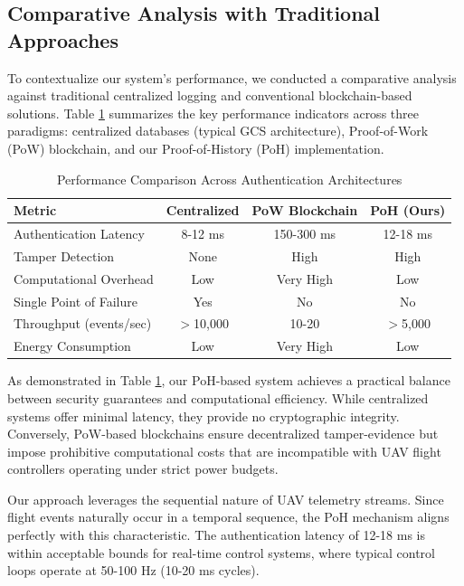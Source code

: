 \documentclass[preprint,12pt]{elsarticle}
\begin{document}

\subsection{Comparative Analysis with Traditional Approaches}

To contextualize our system's performance, we conducted a comparative analysis against traditional centralized logging and conventional blockchain-based solutions. Table \ref{tab:comparison} summarizes the key performance indicators across three paradigms: centralized databases (typical GCS architecture), Proof-of-Work (PoW) blockchain, and our Proof-of-History (PoH) implementation.

\begin{table}[h]
\centering
\small
\caption{Performance Comparison Across Authentication Architectures}
\label{tab:comparison}
\begin{tabular}{|p{3.2cm}|c|c|c|}
\hline
\textbf{Metric} & \textbf{Centralized} & \textbf{PoW Blockchain} & \textbf{PoH (Ours)} \\
\hline
Authentication Latency & 8-12 ms & 150-300 ms & 12-18 ms \\
\hline
Tamper Detection & None & High & High \\
\hline
Computational Overhead & Low & Very High & Low \\
\hline
Single Point of Failure & Yes & No & No \\
\hline
Throughput (events/sec) & $>$10,000 & 10-20 & $>$5,000 \\
\hline
Energy Consumption & Low & Very High & Low \\
\hline
\end{tabular}
\end{table}

As demonstrated in Table \ref{tab:comparison}, our PoH-based system achieves a practical balance between security guarantees and computational efficiency. While centralized systems offer minimal latency, they provide no cryptographic integrity. Conversely, PoW-based blockchains ensure decentralized tamper-evidence but impose prohibitive computational costs that are incompatible with UAV flight controllers operating under strict power budgets.

Our approach leverages the sequential nature of UAV telemetry streams. Since flight events naturally occur in a temporal sequence, the PoH mechanism aligns perfectly with this characteristic. The authentication latency of 12-18 ms is within acceptable bounds for real-time control systems, where typical control loops operate at 50-100 Hz (10-20 ms cycles).
\end{document}
